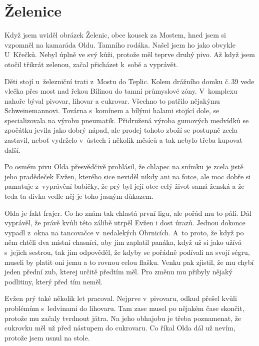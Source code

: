 
\chapter{Želenice}

Když jsem uviděl obrázek Želenic, obce kousek za Mostem, hned jsem si vzpomněl
na kamaráda Oldu. Tamního rodáka. Našel jsem ho jako obvykle U~Křečků. Nebyl
úplně ve svý kůži, protože měl teprve druhý pivo. Až když jsem otočil třikrát
zelenou, začal přicházet k~sobě a vyprávět.

Děti stojí u~železniční trati z~Mostu do Teplic. Kolem drážního domku č.\,39
vede vlečka přes most nad řekou Bílinou do tamní průmyslové zóny. V~komplexu
nahoře býval pivovar, lihovar a cukrovar. Všechno to patřilo nějakýmu
Schweinemannovi. Továrna s~komínem a bílými halami stojící dole, se
specializovala na výrobu pneumatik. Přidružená výroba gumových medvídků se
zpočátku jevila jako dobrý nápad, ale prodej tohoto zboží se postupně zcela
zastavil, neboť vydrželo v~ústech i několik měsíců a tak nebylo třeba kupovat
další.

Po osmém pivu Olda přesvědčivě prohlásil, že chlapec na snímku je zcela jistě
jeho pradědeček Evžen, kterého sice neviděl nikdy ani na fotce, ale moc dobře
si pamatuje z~vyprávění babičky, že prý byl její otec celý život samá ženská a
že teda ta dívka vedle něj je toho jasným důkazem.

Olda je fakt frajer. Co ho znám tak chlastá první ligu, ale pořád mu to pálí.
Dál vyprávěl, že právě kvůli této zálibě utrpěl Evžen i dost úrazů. Jednou
dokonce vypadl z~okna na tancovačce v~nedalekých Obrnicích. A~to proto, že když
po něm chtěli dva místní chasníci, aby jim zaplatil panáka, když už si jako
užívá s~jejich sestrou, tak jim odpověděl, že kdyby se pořádně podívali na
svojí ségru, museli by platit oni jemu a to rovnou celou flašku. Venku pak
zjistil, že mu chybí jeden přední zub, kterej určitě předtím měl. Pro změnu mu
přibyly nějaký podlitiny, který před tím neměl.

Evžen prý také několik let pracoval. Nejprve v~pivovaru, odkud přešel kvůli
problémům s~ledvinami do lihovaru. Tam zase musel po nějakém čase skončit,
protože mu začaly tvrdnout játra. Na jeho obhajobu je třeba poznamenat, že
cukrovku měl už před nástupem do cukrovaru. Co říkal Olda dál už nevím, protože
jsem usnul na stole.

